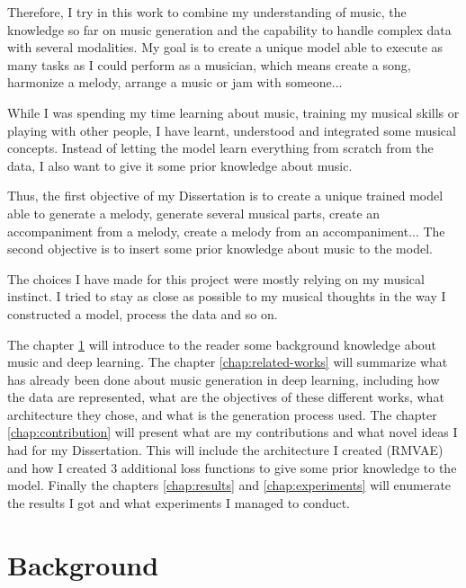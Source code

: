 \documentclass[12pt]{report}
\begin{document}
Therefore, I try in this work to combine my understanding of music, the knowledge so far on music generation and the capability to handle complex data with several modalities.
My goal is to create a unique model able to execute as many tasks as I could perform as a musician, which means create a song, harmonize a melody, arrange a music or jam with someone...

While I was spending my time learning about music, training my musical skills or playing with other people, I have learnt, understood and integrated some musical concepts.
Instead of letting the model learn everything from scratch from the data, I also want to give it some prior knowledge about music.

Thus, the first objective of my Dissertation is to create a unique trained model able to generate a melody, generate several musical parts, create an accompaniment from a melody, create a melody from an accompaniment...
The second objective is to insert some prior knowledge about music to the model.

The choices I have made for this project were mostly relying on my musical instinct.
I tried to stay as close as possible to my musical thoughts in the way I constructed a model, process the data and so on.

The chapter \ref{chap:background} will introduce to the reader some background knowledge about music and deep learning.
The chapter \ref{chap:related-works} will summarize what has already been done about music generation in deep learning, including how the data are represented, what are the objectives of these different works, what architecture they chose, and what is the generation process used.
The chapter \ref{chap:contribution} will present what are my contributions and what novel ideas I had for my Dissertation.
This will include the architecture I created (RMVAE) and how I created 3 additional loss functions to give some prior knowledge to the model.
Finally the chapters \ref{chap:results} and \ref{chap:experiments} will enumerate the results I got and what experiments I managed to conduct.


\chapter{Background}
\label{chap:background}
\end{document}
